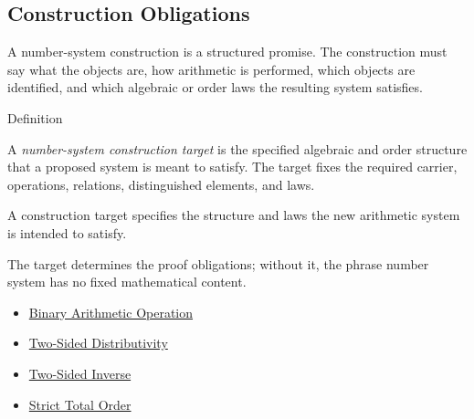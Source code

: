 \subsection*{Construction Obligations}

\begin{remark*}[Exposition]
A number-system construction is a structured promise. The construction must
say what the objects are, how arithmetic is performed, which objects are
identified, and which algebraic or order laws the resulting system satisfies.
\end{remark*}

\begin{definitionbox}{Definition}
\begin{definition}
\label{def:number-system-construction-target}
A \emph{number-system construction target} is the specified algebraic and
order structure that a proposed system is meant to satisfy. The target fixes
the required carrier, operations, relations, distinguished elements, and laws.
\end{definition}

\begin{remark*}
A construction target specifies the structure and laws the new arithmetic
system is intended to satisfy.
\end{remark*}

\begin{remark*}[Interpretation]
The target determines the proof obligations; without it, the phrase number
system has no fixed mathematical content.
\end{remark*}
\end{definitionbox}

\begin{dependencies}
\begin{itemize}
  \item \hyperref[def:binary-arithmetic-operation]{Binary Arithmetic Operation}
  \item \hyperref[def:two-sided-distributivity]{Two-Sided Distributivity}
  \item \hyperref[def:two-sided-inverse]{Two-Sided Inverse}
  \item \hyperref[def:strict-total-order]{Strict Total Order}
\end{itemize}
\end{dependencies}

